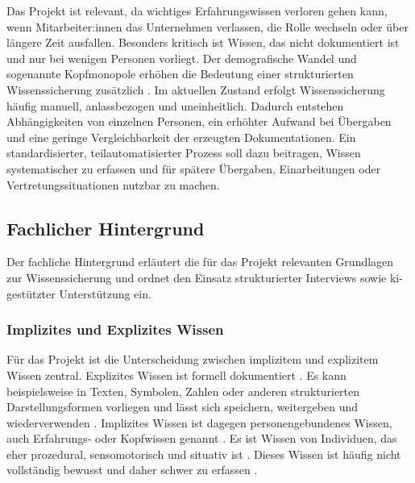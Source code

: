 \documentclass[
  10pt,
  ngerman,
  a4paper,
  toc=graduated,
  numbers=noenddot,
  headings=standardclasses,
  nonumberlist
]{scrartcl}
\begin{document}
Das Projekt ist relevant, da wichtiges Erfahrungswissen verloren gehen kann, wenn Mitarbeiter:innen das Unternehmen verlassen, die Rolle wechseln oder über längere Zeit ausfallen. Besonders kritisch ist Wissen, das nicht dokumentiert ist und nur bei wenigen Personen vorliegt. Der demografische Wandel und sogenannte Kopfmonopole erhöhen die Bedeutung einer strukturierten Wissenssicherung zusätzlich \cite[S. V]{nicole_ottersbock_wissensmanagement_2026}. Im aktuellen Zustand erfolgt Wissenssicherung häufig manuell, anlassbezogen und uneinheitlich. Dadurch entstehen Abhängigkeiten von einzelnen Personen, ein erhöhter Aufwand bei Übergaben und eine geringe Vergleichbarkeit der erzeugten Dokumentationen. Ein standardisierter, teilautomatisierter Prozess soll dazu beitragen, Wissen systematischer zu erfassen und für spätere Übergaben, Einarbeitungen oder Vertretungssituationen nutzbar zu machen.

\subsection{Fachlicher Hintergrund}
\label{fachlicher_hintergrund}
Der fachliche Hintergrund erläutert die für das Projekt relevanten Grundlagen zur Wissenssicherung und ordnet den Einsatz strukturierter Interviews sowie \gls{ki}-gestützter Unterstützung ein.

\subsubsection{Implizites und Explizites Wissen}
\label{implizites_explizites_wissen}

Für das Projekt ist die Unterscheidung zwischen implizitem und explizitem Wissen zentral. Explizites Wissen ist formell dokumentiert \cite[S. 384]{nitsch_digitalisierung_2023}. Es kann beispielsweise in Texten, Symbolen, Zahlen oder anderen strukturierten Darstellungsformen vorliegen und lässt sich speichern, weitergeben und wiederverwenden \cite[S. 434]{nitsch_digitalisierung_2023}. Implizites Wissen ist dagegen personengebundenes Wissen, auch Erfahrungs- oder Kopfwissen genannt \cite[S. 384]{nitsch_digitalisierung_2023}\cite[S. 118]{nicole_ottersbock_wissensmanagement_2026}. Es ist Wissen von Individuen, das eher prozedural, sensomotorisch und situativ ist \cite[S. 385]{nitsch_digitalisierung_2023}. Dieses Wissen ist häufig nicht vollständig bewusst und daher schwer zu erfassen \cite[S. 6]{nicole_ottersbock_wissensmanagement_2026}.
\end{document}
